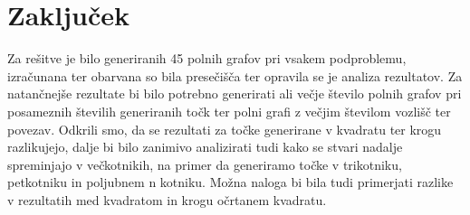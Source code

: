 \documentclass[12pt, a4paper]{article}
\begin{document}
	\section{Zaključek}
	Za rešitve je bilo generiranih 45 polnih grafov pri vsakem podproblemu, izračunana ter obarvana so bila presečišča ter opravila se je analiza rezultatov. Za natančnejše rezultate bi bilo potrebno generirati ali večje število polnih grafov pri posameznih številih generiranih točk ter polni grafi z večjim številom vozlišč ter povezav. Odkrili smo, da se rezultati za točke generirane v kvadratu ter krogu razlikujejo, dalje bi bilo zanimivo analizirati tudi kako se stvari nadalje spreminjajo v večkotnikih, na primer da generiramo točke v trikotniku, petkotniku in poljubnem n kotniku. Možna naloga bi bila tudi primerjati razlike v rezultatih med kvadratom in krogu očrtanem kvadratu.
\end{document}
